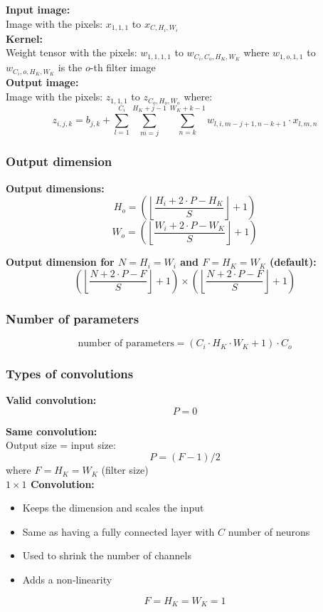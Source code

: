 \documentclass[10pt,a4paper]{article}
\newcommand{\props}{$\circ$}
\newcommand{\iprops}{\item[\props]}
\begin{document}
\textbf{Input image:} \\
Image with the pixels: $x_{1,1,1}$ to $x_{C,H_i,W_i}$ \\

\textbf{Kernel:} \\
Weight tensor with the pixels: $w_{1,1,1,1}$ to $w_{C_i, C_o, H_K, W_K}$ where
$w_{1,o,1,1}$ to $w_{C_i, o, H_K, W_K}$ is the $o$-th filter image \\

\textbf{Output image:} \\
Image with the pixels: $z_{1,1,1}$ to $z_{C_o, H_o, W_o}$ where:
$$
	z_{i,j,k} = b_{j,k} + \sum_{l = 1}^{C_i} \sum_{m = j}^{H_K + j - 1} \sum_{n = k}^{W_K + k - 1} w_{l,i,m-j+1,n-k+1} ⋅ x_{l,m,n}
$$

\subsubsection{Output dimension}

\textbf{Output dimensions:} ~\\
$$
	H_o = \left(\left\lfloor \frac{H_i + 2 ⋅ P - H_K}{S} \right\rfloor + 1\right)
$$
$$
	W_o = \left(\left\lfloor \frac{W_i + 2 ⋅ P - W_K}{S} \right\rfloor + 1\right)
$$

\textbf{Output dimension for $N = H_i = W_i$ and $F = H_K = W_K$ (default):}
$$
	\left(\left\lfloor \frac{N + 2 ⋅ P - F}{S} \right\rfloor + 1\right) \times \left(\left\lfloor \frac{N + 2 ⋅ P - F}{S} \right\rfloor + 1\right)
$$

\subsubsection{Number of parameters}
$$
	\text{number of parameters} = (C_i ⋅ H_K ⋅ W_K + 1) ⋅ C_o
$$

\subsubsection{Types of convolutions}
	\textbf{Valid convolution:} \\
	$$
		P = 0
	$$
	
	\textbf{Same convolution:} \\
	Output size = input size:
	$$
		P = (F - 1) / 2
	$$ where
	$F = H_K = W_K$ (filter size) \\
	
	\textbf{$1 \times 1$ Convolution:} \\
	\begin{itemize}
		\item Keeps the dimension and scales the input
		\iprops Same as having a fully connected layer with $C$ number of neurons
		\iprops Used to shrink the number of channels
		\iprops Adds a non-linearity
	\end{itemize}	
	$$
		F = H_K = W_K = 1
	$$
	
\end{document}
